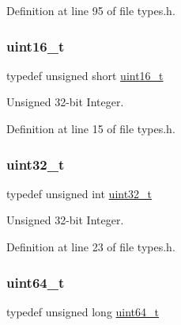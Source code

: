 Definition at line 95 of file types.\+h.

\mbox{\label{a00116_a273cf69d639a59973b6019625df33e30_a273cf69d639a59973b6019625df33e30}} 
\subsubsection{\texorpdfstring{uint16\+\_\+t}{uint16\_t}}
{\footnotesize\ttfamily typedef unsigned short \hyperlink{a00116_a273cf69d639a59973b6019625df33e30_a273cf69d639a59973b6019625df33e30}{uint16\+\_\+t}}



Unsigned 32-\/bit Integer. 



Definition at line 15 of file types.\+h.

\mbox{\label{a00116_a435d1572bf3f880d55459d9805097f62_a435d1572bf3f880d55459d9805097f62}} 
\subsubsection{\texorpdfstring{uint32\+\_\+t}{uint32\_t}}
{\footnotesize\ttfamily typedef unsigned int \hyperlink{a00116_a435d1572bf3f880d55459d9805097f62_a435d1572bf3f880d55459d9805097f62}{uint32\+\_\+t}}



Unsigned 32-\/bit Integer. 



Definition at line 23 of file types.\+h.

\mbox{\label{a00116_aa232ecf786a74ce5363c36c10798d2b1_aa232ecf786a74ce5363c36c10798d2b1}} 
\subsubsection{\texorpdfstring{uint64\+\_\+t}{uint64\_t}}
{\footnotesize\ttfamily typedef unsigned long \hyperlink{a00116_aa232ecf786a74ce5363c36c10798d2b1_aa232ecf786a74ce5363c36c10798d2b1}{uint64\+\_\+t}}



